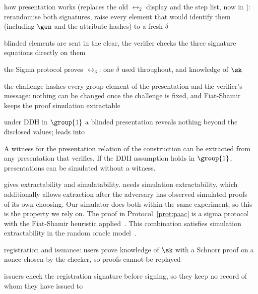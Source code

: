 \begin{outline}
  \item how presentation works (replaces the old $\rel_2$ display and the step list, now in ): rerandomise both signatures, raise every element that would identify them (including $\gen$ and the attribute hashes) to a fresh $\delta$
  \item blinded elements are sent in the clear, the verifier checks the three signature equations directly on them
  \item the Sigma protocol proves $\rel_3$: one $\delta$ used throughout, and knowledge of $\sk$
  \item the challenge hashes every group element of the presentation and the verifier's message: nothing can be changed once the challenge is fixed, and Fiat-Shamir keeps the proof simulation extractable
  \item under DDH in $\group{1}$ a blinded presentation reveals nothing beyond the disclosed values; leads into 
\end{outline}

\begin{lemma}\label{lem:agg-creds-sigma}

  A witness for the presentation relation of the construction can be extracted
from any presentation that verifies. If the DDH assumption holds in
$\group{1}$, presentations can be simulated without a witness.

\end{lemma}

 gives extractability and simulatability.
 needs simulation extractability, which additionally
allows extraction after the adversary has observed simulated proofs of its own
choosing. Our simulator does both within the same experiment, so this is the
property we rely on.  The proof in Protocol~\ref{prot:paac} is a sigma protocol with the
Fiat-Shamir heuristic applied~\cite{C:FiaSha86}. This combination satisfies
simulation extractability in the random oracle model~\cite{INDOCRYPT:FKMV12}.

\begin{outline}
  \item registration and issuance: users prove knowledge of $\sk$ with a Schnorr proof on a nonce chosen by the checker, so proofs cannot be replayed
  \item issuers check the registration signature before signing, so they keep no record of whom they have issued to
\end{outline}

